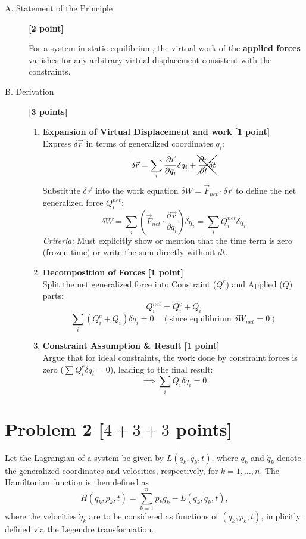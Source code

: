 \documentclass[11pt, a4paper]{article} %
\begin{document}
\begin{description}
    \item[A. Statement of the Principle] \hfill \textbf{[2 point]}
    
    For a system in static equilibrium, the virtual work of the \textbf{applied forces} vanishes for any arbitrary virtual displacement consistent with the constraints.

    \item[B. Derivation] \hfill \textbf{[3 points]}
    \begin{enumerate}
        \item \textbf{Expansion of Virtual Displacement and work} \hfill \textbf{[1 point]} \\
        Express $\delta \vec{r}$ in terms of generalized coordinates $q_i$:
        $$ \delta \vec{r} = \sum_i \frac{\partial \vec{r}}{\partial q_i} \delta q_i + \xcancel{\frac{\partial \vec{r}}{\partial t} \delta t} $$
        Substitute $\delta \vec{r}$ into the work equation $\delta W = \vec{F}_{net} \cdot \delta \vec{r}$ to define the net generalized force $Q_i^{net}$:
        $$ \delta W = \sum_i \left( \vec{F}_{net} \cdot \frac{\partial \vec{r}}{\partial q_i} \right) \delta q_i = \sum_i Q_i^{net} \delta q_i $$
        \textit{Criteria:} Must explicitly show or mention that the time term is zero (frozen time) or write the sum directly without $dt$.
        
        \item \textbf{Decomposition of Forces} \hfill \textbf{[1 point]} \\
        Split the net generalized force into Constraint ($Q^c$) and Applied ($Q$) parts:
        $$ Q_i^{net} = Q_i^c + Q_i $$
        $$ \sum_i (Q_i^c + Q_i) \delta q_i = 0 \quad (\text{since equilibrium } \delta W_{net}=0) $$

        \item \textbf{Constraint Assumption \& Result} \hfill \textbf{[1 point]} \\
        Argue that for ideal constraints, the work done by constraint forces is zero ($\sum Q_i^c \delta q_i = 0$), leading to the final result:
        $$ \implies \boxed{\sum_i Q_i \delta q_i = 0} $$
    \end{enumerate}
\end{description}



\newpage 
\section*{Problem 2 [$4+3+3$ points]} 
Let the Lagrangian of a system be given by $L(q_k, \dot{q}_k, t)$, where $q_k$ and $\dot{q}_k$ denote the generalized coordinates and velocities, respectively, for $k = 1, \dots, n$. 
The Hamiltonian function is then defined as
\[
H(q_k, p_k, t) = \sum_{k=1}^n p_k \dot{q}_k - L(q_k, \dot{q}_k, t),
\]
where the velocities $\dot{q}_k$ are to be considered as functions of $(q_k, p_k, t)$, implicitly defined via the Legendre transformation.
\end{document}
